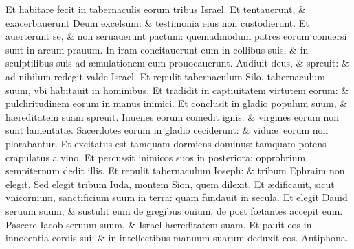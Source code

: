 \documentclass[a5paper,10pt]{book}
\def\ae{æ}
\def\oe{œ}
\begin{document}
\begin{multicols*}{2}
\newline \color{red} E\color{black}t habitare fecit in tabernaculis eorum tribus Israel.
\newline \color{red} E\color{black}t tentauerunt, \& exacerbauerunt Deum excelsum: \& testimonia eius non custodierunt.
\newline \color{red} E\color{black}t auerterunt se, \& non seruauerunt pactum: quemadmodum patres eorum conuersi sunt in arcum prauum.
\newline \color{red} I\color{black}n iram concitauerunt eum in collibus suis, \& in sculptilibus suis ad \ae mulationem eum prouocauerunt.
\newline \color{red} A\color{black}udiuit deus, \& spreuit: \& ad nihilum redegit valde Israel.
\newline \color{red} E\color{black}t repulit tabernaculum Silo, tabernaculum suum, vbi habitauit in hominibus.
\newline \color{red} E\color{black}t tradidit in captiuitatem virtutem eorum: \& pulchritudinem eorum in manus inimici.
\newline \color{red} E\color{black}t conclusit in gladio populum suum, \& h\ae reditatem suam spreuit.
\newline \color{red} I\color{black}uuenes eorum comedit ignis: \& virgines eorum non sunt lamentat\ae .
\newline \color{red} S\color{black}acerdotes eorum in gladio ceciderunt: \& vidu\ae \ eorum non plorabantur.
\newline \color{red} E\color{black}t excitatus est tamquam dormiens dominus: tamquam potens crapulatus a vino.
\newline \color{red} E\color{black}t percussit inimicos suos in posteriora: opprobrium sempiternum dedit illis.
\newline \color{red} E\color{black}t repulit tabernaculum Ioseph: \& tribum Ephraim non elegit.
\newline \color{red} S\color{black}ed elegit tribum Iuda, montem Sion, quem dilexit.
\newline \color{red} E\color{black}t \ae dificauit, sicut vnicornium, sanctificium suum in terra: quam fundauit in secula.
\newline \color{red} E\color{black}t elegit Dauid seruum suum, \& sustulit eum de gregibus ouium, de post f\oe tantes accepit eum.
\newline \color{red} P\color{black}ascere Iacob seruum suum, \& Israel h\ae reditatem suam.
\newline \color{red} E\color{black}t pauit eos in innocentia cordis sui: \& in intellectibus manuum suarum deduxit eos. \quad \color{red} Antiphona. \color{black}

\end{multicols*}
\end{document}

